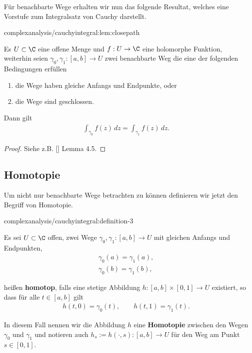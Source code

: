 \documentclass[letterpaper,10pt,german]{jupyterBook}
\begin{document}
\par
Für benachbarte Wege erhalten wir nun das folgende Resultat, welches eine Vorstufe zum Integralsatz von Cauchy darstellt.
\begin{lemma}{}{complexanalysis/cauchyintegral:lem:closepath}



\par
Es \(U\subset\C\) eine offene Menge und \(f:U\to\C\) eine holomorphe Funktion, weiterhin seien \(\gamma_0,\gamma_1:[a,b]\to U\) zwei benachbarte Weg die eine der folgenden Bedingungen erfüllen
\begin{enumerate}

\item {} 
\par
die Wege haben gleiche Anfangs  und Endpunkte, oder

\item {} 
\par
die Wege sind geschlossen.

\end{enumerate}

\par
Dann gilt
\begin{align*}
\int_{\gamma_0} f(z)\, dz = \int_{\gamma_1} f(z)\, dz.
\end{align*}\end{lemma}

\begin{proof}
 Siehe z.B. {[}{]} Lemma 4.5.
\end{proof}


\subsection{Homotopie}
\label{\detokenize{complexanalysis/cauchyintegral:homotopie}}
\par
Um nicht nur benachbarte Wege betrachten zu können definieren wir jetzt den Begriff von Homotopie.
\begin{definition}{}{complexanalysis/cauchyintegral:definition-3}



\par
Es sei \(U\subset\C\) offen, zwei Wege \(\gamma_0, \gamma_1:[a,b]\to U\) mit gleichen Anfangs und Endpunkten,
\begin{align*}
\gamma_0(a) = \gamma_1(a),\\
\gamma_0(b) = \gamma_1(b),
\end{align*}
\par
heißen \textbf{homotop}, falls eine stetige Abbildung \(h:[a,b]\times[0,1]\to U\) existiert, so dass für alle \(t\in[a,b]\) gilt
\begin{align*}
h(t,0) = \gamma_0(t), \qquad h(t,1) = \gamma_1(t).
\end{align*}
\par
In diesem Fall nennen wir die Abbildung \(h\) eine \textbf{Homotopie} zwischen den Wegen \(\gamma_0\) und \(\gamma_1\) und notieren auch \(h_s:=h(\cdot,s):[a,b]\to U\) für den Weg am Punkt \(s\in [0,1]\).
\end{definition}
\end{document}
